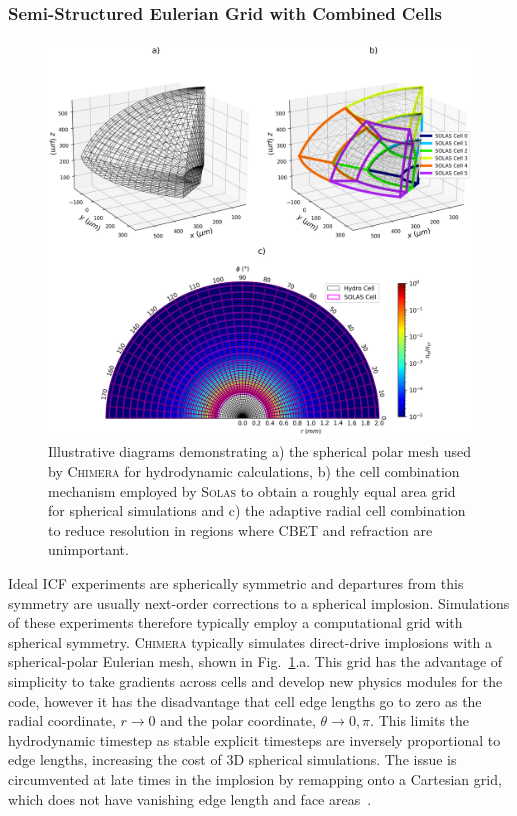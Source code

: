 \subsubsection{Semi-Structured Eulerian Grid with Combined Cells}

\begin{figure}[t!]
    \includegraphics[width=\linewidth]{Numerics/Images/solas_cells_3imagescombined.png}
    \centering
    \caption{Illustrative diagrams demonstrating a) the spherical polar mesh used by \textsc{Chimera} for hydrodynamic calculations, b) the cell combination mechanism employed by \textsc{Solas} to obtain a roughly equal area grid for spherical simulations and c) the adaptive radial cell combination to reduce resolution in regions where \ac{CBET} and refraction are unimportant.}%
    \label{fig:SOLAS_combined_cells}
\end{figure}

Ideal \ac{ICF} experiments are spherically symmetric and departures from this symmetry are usually next-order corrections to a spherical implosion.
Simulations of these experiments therefore typically employ a computational grid with spherical symmetry.
\textsc{Chimera} typically simulates direct-drive implosions with a spherical-polar Eulerian mesh, shown in Fig.~\ref{fig:SOLAS_combined_cells}.a.
This grid has the advantage of simplicity to take gradients across cells and develop new physics modules for the code, however it has the disadvantage that cell edge lengths go to zero as the radial coordinate, $r\rightarrow 0$ and the polar coordinate, $\theta\rightarrow 0,\pi$.
This limits the hydrodynamic timestep as stable explicit timesteps are inversely proportional to edge lengths, increasing the cost of 3D spherical simulations.
The issue is circumvented at late times in the implosion by remapping onto a Cartesian grid, which does not have vanishing edge length and face areas~\cite{chittenden_signatures_2016}.

